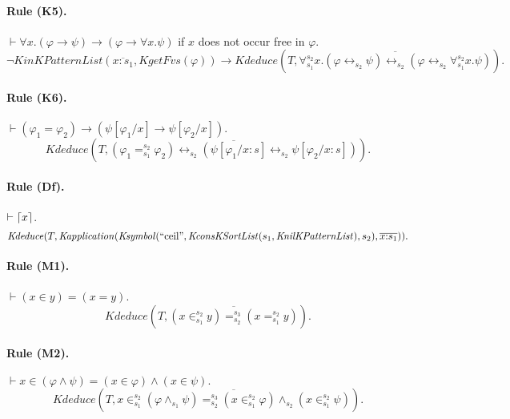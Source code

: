 \documentclass[UTF8,11pt]{article}
\theoremstyle{plain}
\theoremstyle{definition}
\theoremstyle{remark}
\DeclarePairedDelimiter{\ceil}{\lceil}{\rceil}
\newcommand{\cln}{{:}}
\newcommand{\Ksymbol}{\mathit{Ksymbol}}
\newcommand{\KnilKPatternList}{\mathit{KnilKPatternList}}
\newcommand{\KinKPatternList}{\mathit{KinKPatternList}}
\newcommand{\KconsKSortList}{\mathit{KconsKSortList}}
\newcommand{\Kapplication}{\mathit{Kapplication}}
\newcommand{\KgetFvs}{\mathit{KgetFvs}}
\newcommand{\Kdeduce}{\mathit{Kdeduce}}
\newcommand{\quot}[1]{\mathrm{``#1"}}
\begin{document}
\paragraph{Rule (K5).}
$\vdash \forall x . (\varphi \to \psi) \to (\varphi \to \forall x . \psi)$ if $x$ does not occur free in $\varphi$. 
\begin{equation*}
\neg\KinKPatternList(\overline{x \cln s_1}, \KgetFvs(\varphi))
\to \Kdeduce(T, \overline{\forall_{s_1}^{s_2} x . (\varphi \leftrightarrow_{s_2} \psi) \leftrightarrow_{s_2} (\varphi \leftrightarrow_{s_2} \forall_{s_1}^{s_2} x . \psi)}).
\end{equation*}

\paragraph{Rule (K6).}
$\vdash (\varphi_1 = \varphi_2) \to (\psi[\varphi_1/x] \to \psi[\varphi_2/x])$.
\begin{equation*}
\Kdeduce(T, \overline{(\varphi_1 =_{s_1}^{s_2} \varphi_2) \leftrightarrow_{s_2} (\psi[\varphi_1/x \cln s] \leftrightarrow_{s_2} \psi[\varphi_2/x \cln s])}).
\end{equation*}

\paragraph{Rule (Df).}
$\vdash \ceil{x}$.
\begin{equation*}
\Kdeduce(T, \Kapplication(\Ksymbol(\quot{ceil}, \KconsKSortList(s_1, \KnilKPatternList), s_2), \overline{x \cln s_1})).
\end{equation*}

\paragraph{Rule (M1).}
$\vdash (x \in y) = (x = y)$.
\begin{equation*}
\Kdeduce(T, \overline{(x \in_{s_1}^{s_2} y) =_{s_2}^{s_3} (x =_{s_1}^{s_2} y)}).
\end{equation*}

\paragraph{Rule (M2).}
$\vdash x \in (\varphi \wedge \psi) = (x \in \varphi) \wedge (x \in \psi).$
\begin{equation*}
\Kdeduce(T, \overline{x \in_{s_1}^{s_2} (\varphi \wedge_{s_1} \psi) =_{s_2}^{s_3} (x \in_{s_1}^{s_2} \varphi) \wedge_{s_2} (x \in_{s_1}^{s_2} \psi)}).
\end{equation*}
\end{document}
